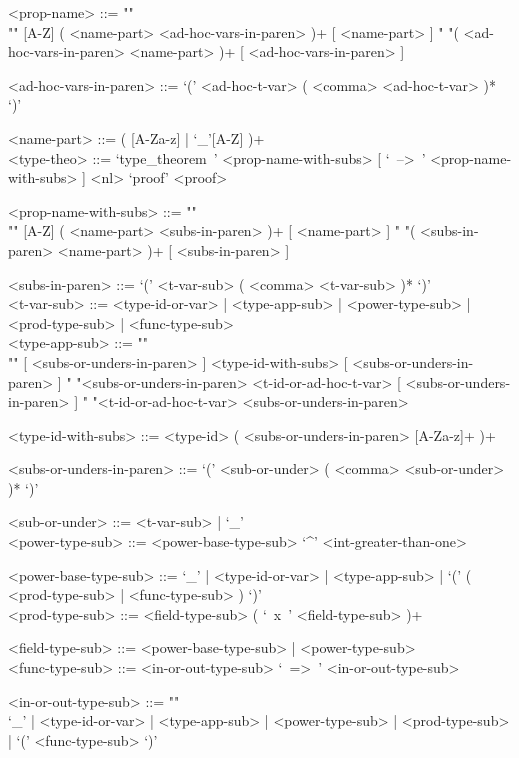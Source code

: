 \documentclass{article}
\begin{document}
\begin{grammar}
<prop-name> ::=  ""\\""
[A-Z] ( <name-part> <ad-hoc-vars-in-paren> )+ [ <name-part> ]
\alt " "( <ad-hoc-vars-in-paren> <name-part> )+ [ <ad-hoc-vars-in-paren> ]

<ad-hoc-vars-in-paren> ::= `(' <ad-hoc-t-var> ( <comma> <ad-hoc-t-var> )* `)'

<name-part> ::= ( [A-Za-z] | `_'[A-Z] )+
\\

<type-theo> ::= 
`type_theorem\ ' <prop-name-with-subs> [ `\ -->\ ' <prop-name-with-subs> ] <nl> 
`proof' <proof>

<prop-name-with-subs> ::=  ""\\""
[A-Z] ( <name-part> <subs-in-paren> )+ [ <name-part> ]
\alt " "( <subs-in-paren> <name-part> )+ [ <subs-in-paren> ]

<subs-in-paren> ::= `(' <t-var-sub> ( <comma> <t-var-sub> )* `)'
\\

<t-var-sub> ::=
<type-id-or-var> | <type-app-sub> | <power-type-sub> | <prod-type-sub> |
<func-type-sub> 
\\

<type-app-sub> ::= ""\\""
[ <subs-or-unders-in-paren> ] <type-id-with-subs> [ <subs-or-unders-in-paren> ]
\alt
" "<subs-or-unders-in-paren> <t-id-or-ad-hoc-t-var> [ <subs-or-unders-in-paren> ]
\alt
" "<t-id-or-ad-hoc-t-var> <subs-or-unders-in-paren>

<type-id-with-subs> ::= <type-id> ( <subs-or-unders-in-paren> [A-Za-z]+ )+

<subs-or-unders-in-paren> ::=
`(' <sub-or-under> ( <comma> <sub-or-under> )* `)'

<sub-or-under> ::= <t-var-sub> | `_'
\\

<power-type-sub> ::= <power-base-type-sub> `^' <int-greater-than-one>

<power-base-type-sub> ::= 
`_' | <type-id-or-var> | <type-app-sub> |
`(' ( <prod-type-sub> | <func-type-sub> ) `)'
\\

<prod-type-sub> ::= <field-type-sub> ( `\ x\ ' <field-type-sub> )+

<field-type-sub> ::= <power-base-type-sub> | <power-type-sub>
\\

<func-type-sub> ::= <in-or-out-type-sub> `\ =>\ ' <in-or-out-type-sub>

<in-or-out-type-sub> ::= ""\\
`_' | <type-id-or-var> | <type-app-sub> | <power-type-sub> | <prod-type-sub> |
`(' <func-type-sub> `)'
\\


\end{grammar}
\end{document}
